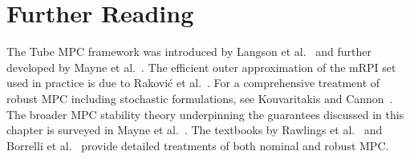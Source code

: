 \section*{Further Reading}

The Tube MPC framework was introduced by Langson et al.~\cite{Langson2004} and further
developed by Mayne et al.~\cite{Mayne2005}. The efficient outer approximation of the
mRPI set used in practice is due to Rakovi{\'c} et al.~\cite{Rakovic2005}. For a
comprehensive treatment of robust MPC including stochastic formulations, see
Kouvaritakis and Cannon~\cite{Kouvaritakis2016}. The broader MPC stability theory
underpinning the guarantees discussed in this chapter is surveyed in
Mayne et al.~\cite{Mayne2000}. The textbooks by Rawlings et al.~\cite{Rawlings2017}
and Borrelli et al.~\cite{Borrelli2017} provide detailed treatments of both nominal
and robust MPC.

